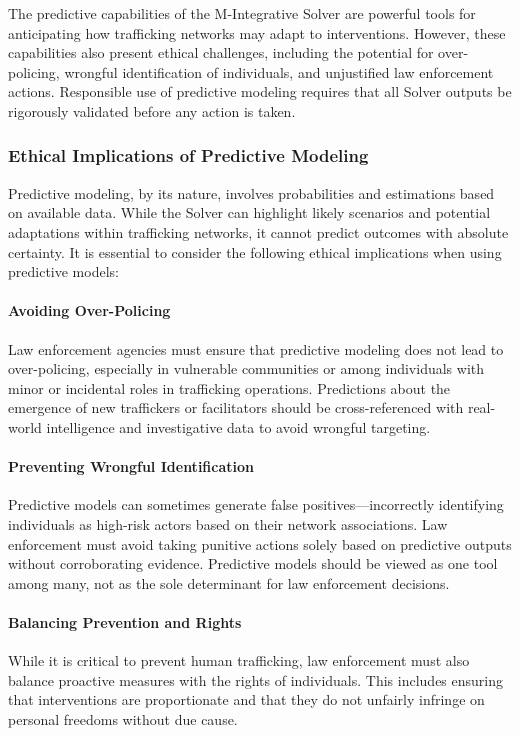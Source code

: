 \documentclass[%
 preprint, linenumbers,
 amsmath,amssymb,
 aps, physrev,
]{revtex4-2}
\begin{document}
The predictive capabilities of the M-Integrative Solver are powerful tools for anticipating how trafficking networks may adapt to interventions. However, these capabilities also present ethical challenges, including the potential for over-policing, wrongful identification of individuals, and unjustified law enforcement actions. Responsible use of predictive modeling requires that all Solver outputs be rigorously validated before any action is taken.

\subsubsection{Ethical Implications of Predictive Modeling}

Predictive modeling, by its nature, involves probabilities and estimations based on available data. While the Solver can highlight likely scenarios and potential adaptations within trafficking networks, it cannot predict outcomes with absolute certainty. It is essential to consider the following ethical implications when using predictive models:

\paragraph{Avoiding Over-Policing}
Law enforcement agencies must ensure that predictive modeling does not lead to over-policing, especially in vulnerable communities or among individuals with minor or incidental roles in trafficking operations. Predictions about the emergence of new traffickers or facilitators should be cross-referenced with real-world intelligence and investigative data to avoid wrongful targeting.

\paragraph{Preventing Wrongful Identification}
Predictive models can sometimes generate false positives—incorrectly identifying individuals as high-risk actors based on their network associations. Law enforcement must avoid taking punitive actions solely based on predictive outputs without corroborating evidence. Predictive models should be viewed as one tool among many, not as the sole determinant for law enforcement decisions.

\paragraph{Balancing Prevention and Rights}
While it is critical to prevent human trafficking, law enforcement must also balance proactive measures with the rights of individuals. This includes ensuring that interventions are proportionate and that they do not unfairly infringe on personal freedoms without due cause.
\end{document}
